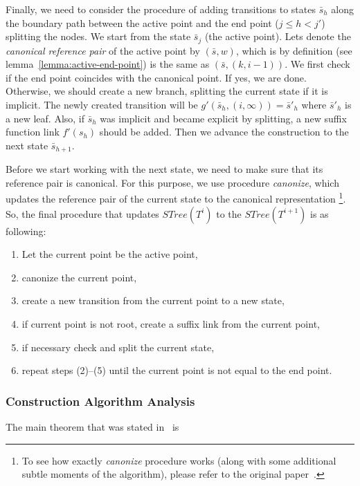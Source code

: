 \documentclass[paper=a4, fontsize=11pt]{scrartcl} %
\numberwithin{equation}{section} %
\numberwithin{figure}{section} %
\numberwithin{table}{section} %
\begin{document}
\par Finally, we need to consider the procedure of adding transitions to states $\bar s_h$ along the boundary path between the active point and the end point ($j \le h < j'$) splitting the nodes. We start from the state $\bar s_j$ (the active point). Lets denote the \textit{canonical reference pair} of the active point by $(\bar s, w)$, which is by definition (see lemma~\ref{lemma:active-end-point}) is the same as $(\bar s, (k, i-1))$. We first check if the end point coincides with the canonical point. If yes, we are done. Otherwise, we should create a new branch, splitting the current state if it is implicit. The newly created transition will be $g'(\bar s_h, (i, \infty)) = \bar s'_h$ where $\bar s'_h$ is a new leaf. Also, if $\bar s_h$ was implicit and became explicit by splitting, a new suffix function link $f'(s_h)$ should be added. Then we advance the construction to the next state $\bar s_{h+1}$.

\par Before we start working with the next state, we need to make sure that its reference pair is canonical. For this purpose, we use procedure \textit{canonize}, which updates the reference pair of the current state to the canonical representation \footnote{To see how exactly \textit{canonize} procedure works (along with some additional subtle moments of the algorithm), please refer to the original paper~\cite{ukkonen1995line}.}. So, the final procedure that updates $STree(T^i)$ to the $STree(T^{i+1})$ is as following:

\begin{enumerate}
  \item Let the current point be the active point,
  \item canonize the current point,
  \item create a new transition from the current point to a new state,
  \item if current point is not root, create a suffix link from the current point,
  \item if necessary check and split the current state,
  \item repeat steps (2)--(5) until the current point is not equal to the end point.
\end{enumerate}

\subsubsection{Construction Algorithm Analysis}
\noindent The main theorem that was stated in~\cite{ukkonen1995line} is
\end{document}
